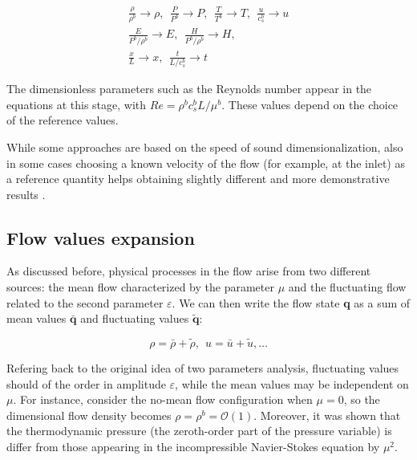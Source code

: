 \begin{subequations}
\label{eq:NSderDimens}
\begin{align}
    \frac{\rho}{\rho^b} \rightarrow \rho, \ \ \frac{P}{P^b} \rightarrow P, \ \ \frac{T}{T^b} \rightarrow T, \ \ \frac{u}{c_s^b} \rightarrow u\\
    \frac{E}{P^b/\rho^b} \rightarrow E, \ \ \frac{H}{P^b/\rho^b} \rightarrow H, \\
    \frac{x}{L} \rightarrow x, \ \ \frac{t}{L/ c_s^b} \rightarrow t
\end{align}
\end{subequations}

The dimensionless parameters such as the Reynolds number appear in the equations at this stage, with $Re = \rho^b c_s^b L / \mu^b$. These values depend on the choice of the reference values.

While some approaches \cite{culick2006unsteady} are based on the speed of sound dimensionalization, also in some cases choosing a known velocity of the flow (for example, at the inlet) as a reference quantity helps obtaining slightly different and more demonstrative results \cite{Muller99lowmach}. 

\subsection{Flow values expansion}

As discussed before, physical processes in the flow arise from two different sources: the mean flow characterized by the parameter $\mu$ and the fluctuating flow related to the second parameter $\varepsilon$. We can then write the flow state \textbf{q} as a sum of mean values $\bar{\mathbf{q}}$ and fluctuating values $\tilde{\mathbf{q}}$:

\begin{equation}
\label{eq:NSderMeanFluctExpansion}
\rho = \bar{\rho} + \tilde{\rho}, \ \ u = \bar{u} + \tilde{u}, \dots
\end{equation}

Refering back to the original idea of two parameters analysis, fluctuating values should of the order in amplitude $\varepsilon$, while the mean values may be independent on $\mu$. For instance, consider the no-mean flow configuration when $\mu = 0$, so the dimensional flow density becomes $\rho = \rho^b = \mathcal{O}(1)$. Moreover, it was shown \cite{Muller99lowmach} that the thermodynamic pressure (the zeroth-order part of the pressure variable) is differ from those appearing in the incompressible Navier-Stokes equation by $\mu^2$.

